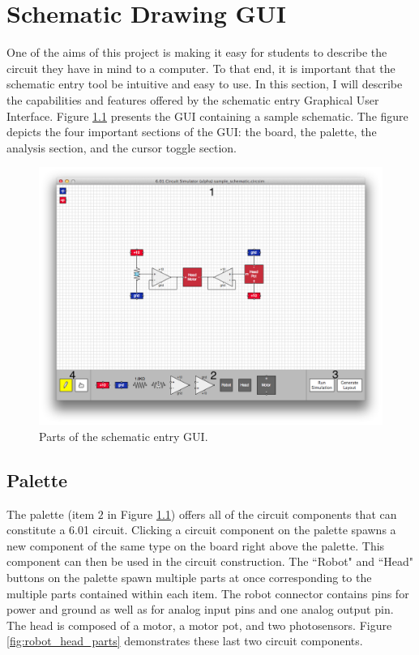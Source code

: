 
\chapter{Schematic Drawing GUI}
\label{app:gui}

One of the aims of this project is making it easy for students to describe the
circuit they have in mind to a computer. To that end, it is important that the
schematic entry tool be intuitive and easy to use. In this section, I will
describe the capabilities and features offered by the schematic entry Graphical
User Interface. Figure \ref{fig:gui} presents the GUI containing a sample
schematic. The figure depicts the four important sections of the GUI: the board,
the palette, the analysis section, and the cursor toggle section.

\begin{figure}
\begin{center}
\includegraphics[width=\textwidth]{Images/gui.png}
\caption{Parts of the schematic entry GUI.}
\label{fig:gui}
\end{center}
\end{figure}

\section{Palette}

The palette (item $2$ in Figure \ref{fig:gui}) offers all of the circuit
components that can constitute a 6.01 circuit. Clicking a circuit component on
the palette spawns a new component of the same type on the board right above
the palette. This component can then be used in the circuit construction. The
``Robot" and ``Head" buttons on the palette spawn multiple parts at once
corresponding to the multiple parts contained within each item. The robot
connector contains pins for power and ground as well as for analog input pins
and one analog output pin. The head is composed of a motor, a motor pot, and
two photosensors. Figure \ref{fig:robot_head_parts} demonstrates these last two
circuit components.

